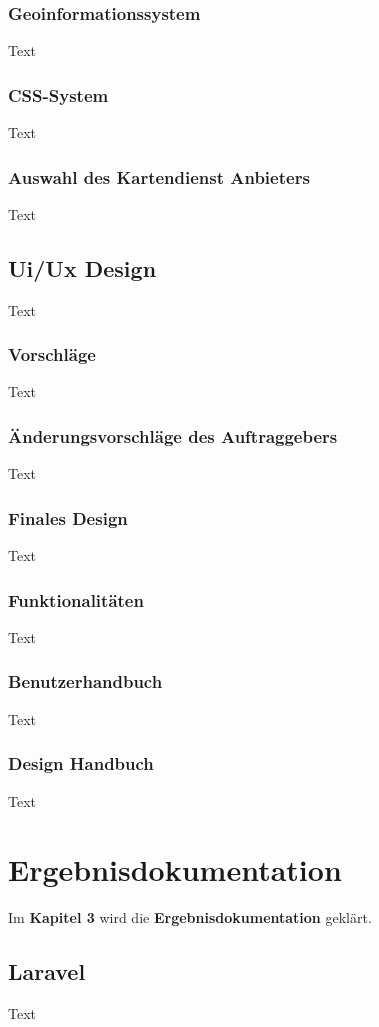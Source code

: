 \subsection{Geoinformationssystem}
Text
\subsection{CSS-System}
Text
\subsection{Auswahl des Kartendienst Anbieters}
Text



\section{Ui/Ux Design}
Text
\subsection{Vorschläge}
Text
\subsection{Änderungsvorschläge des Auftraggebers }
Text
\subsection{Finales Design}
Text
\subsection{Funktionalitäten }
Text
\subsection{Benutzerhandbuch}
Text
\subsection{Design Handbuch}
Text






\chapter{Ergebnisdokumentation }
Im \textbf{Kapitel 3} wird die \textbf{Ergebnisdokumentation} geklärt.

\section{Laravel }
Text

